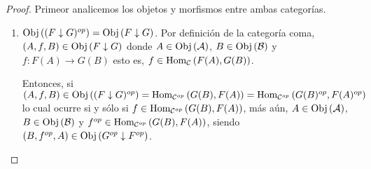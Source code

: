 \documentclass[12pt]{report}
\theoremstyle{largebreak}
\newcommand\cf[3]{\ensuremath{#1:#2\rightarrow#3}}
\newcommand{\Obj}[1]{\ensuremath{\textup{Obj}\left(#1\right)}}
\newcommand{\Hom}[3]{\ensuremath{\textup{Hom}_{#1}\left(#2,#3\right)}}
\begin{document}
    \begin{proof}
        Primeor analicemos los objetos y morfismos entre ambas categorías.
        \begin{enumerate}
            \item $\Obj{(F\downarrow G)^{op}}=\Obj{F\downarrow G}$.
            Por definición de la categoría coma, $(A,f,B)\in\Obj{F\downarrow G}$ donde $A\in\Obj{\mathcal{A}}$, $B\in\Obj{\mathcal{B}}$ y $\cf{f}{F(A)}{G(B)}$ esto es, $f\in\Hom{\mathcal{C}}{F(A)}{G(B)}$.

            Entonces, si $(A,f,B)\in\Obj{(F\downarrow G)^{op}}=\Hom{\mathcal{C}^{op}}{G(B)}{F(A)}=\Hom{\mathcal{C}^{op}}{G(B)^{op}}{F(A)^{op}}$ lo cual ocurre si y sólo si $f\in\Hom{\mathcal{C}^{op}}{G(B)}{F(A)}$, más aún, $A\in\Obj{\mathcal{A}}$, $B\in\Obj{\mathcal{B}}$ y $f^{op}\in\Hom{\mathcal{C}^{op}}{G(B)}{F(A)}$, siendo $(B,f^{op},A)\in\Obj{G^{op}\downarrow F^{op}}$. 


\end{enumerate}
\end{proof}
\end{document}
